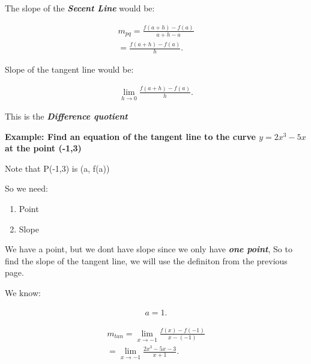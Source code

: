 \documentclass{report}
\begin{document}
        \bigbreak \noindent 
        The slope of the \textbf{\textit{Secent Line}} would be:

        \begin{align*}
            m_{pq} = \frac{f \left(a+h\right) - f \left(a\right)}{a + h - a} \\
            = \frac{f \left(a+h\right) - f(a)}{h}
        .\end{align*}

        \bigbreak \noindent 
        Slope of the tangent line would be:

        \begin{align*}
           \lim\limits_{h \to 0}{ \frac{f \left(a + h\right) - f(a)}{h}} 
        .\end{align*}

        \bigbreak \noindent 
        This is the \textbf{\textit{Difference quotient}}

        \pagebreak \bigbreak \noindent
        \begin{large}
            \textbf{Example: Find an equation of the tangent line to the curve $y = 2x^3 - 5x$ at the point (-1,3)}
        \end{large}

        \bigbreak \noindent 
        \begin{center}
            Note that P(-1,3) is (a, f(a))
        \end{center}

        \bigbreak \noindent 
        So we need:
        \begin{enumerate}
            \item Point
            \item Slope
        \end{enumerate}

        \bigbreak \noindent 
        We have a point, but we dont have slope since we only have \textbf{\textit{one point}}, So to find the slope
        of the tangent line, we will use the definiton from the previous page. 

        \bigbreak \noindent 
        \begin{center}
            We know:
        \end{center}
        \begin{align*}
            a = 1
        .\end{align*}

        \begin{align*}
            m_{tan} = \lim\limits_{x \to -1}{ \frac{f(x) - f(-1)}{x- \left(-1\right)}} \\ 
            = \lim\limits_{x \to -1}{ \frac{2x^3-5x-3}{x+1}}
        .\end{align*}
\end{document}

